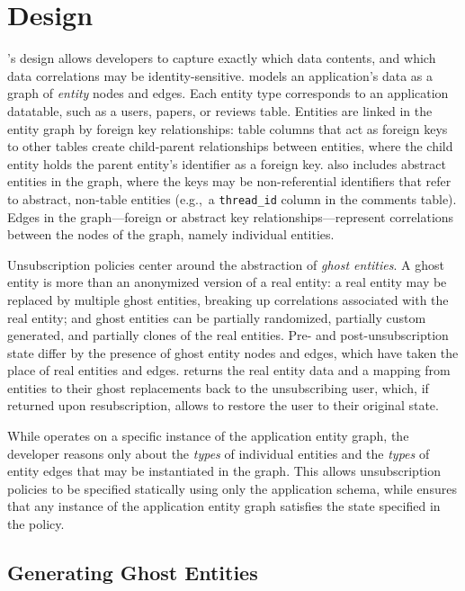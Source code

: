 \section{Design}
\sys's design allows developers to capture exactly which data contents, and which data correlations may be
identity-sensitive. \sys models an application's data as a graph of \emph{entity} nodes and edges.
Each entity type corresponds to an application datatable, such as a users, papers, or reviews table.
Entities are linked in the entity graph by foreign key relationships: table columns that act as
foreign keys to other tables create child-parent relationships between entities, where the child
entity holds the parent entity's identifier as a foreign key. \sys also includes
abstract entities in the graph, where the keys may be non-referential identifiers that refer to
abstract, non-table entities (e.g.,\ a \texttt{thread\_id} column in the comments table).  Edges in
the graph---foreign or abstract key relationships---represent correlations between the nodes of the
graph, namely individual entities.

Unsubscription policies center around the abstraction of \emph{ghost entities}. A ghost entity is
more than an anonymized version of a real entity: a real entity may be replaced by multiple ghost
entities, breaking up correlations associated with the real entity; and ghost entities can be
partially randomized, partially custom generated, and partially clones of the real entities. 
Pre- and post-unsubscription state differ by the presence of ghost entity nodes and edges, which
have taken the place of real entities and edges. \sys returns the real entity data and a mapping
from entities to their ghost replacements back to the unsubscribing user, which, if returned upon
resubscription, allows \sys to restore the user to their original state.

While \sys operates on a specific instance of the application entity graph, the developer reasons
only about the \emph{types} of individual entities and the \emph{types} of entity edges that may be
instantiated in the graph. This allows unsubscription policies to be specified statically using only
the application schema, while \sys ensures that any instance of the application entity graph
satisfies the state specified in the policy.

\subsection{Generating Ghost Entities}
\label{sec:ghosting}

